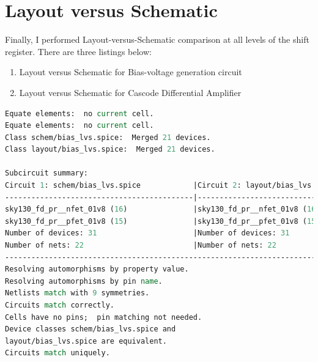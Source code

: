 \documentclass[11pt]{article}
\begin{document}
    \section{Layout versus Schematic}
    Finally, I performed Layout-versus-Schematic comparison at all levels of the shift register. There are three listings below:
    \begin{enumerate}
        \item Layout versus Schematic for Bias-voltage generation circuit
        \item Layout versus Schematic for Cascode Differential Amplifier
    \end{enumerate}
    \begin{lstlisting}[language=tcl, caption=\textbf{Layout versus Schematic for Bias-voltage generation circuit}]
Equate elements:  no current cell.
Equate elements:  no current cell.
Class schem/bias_lvs.spice:  Merged 21 devices.
Class layout/bias_lvs.spice:  Merged 21 devices.

Subcircuit summary:
Circuit 1: schem/bias_lvs.spice            |Circuit 2: layout/bias_lvs.spice           
-------------------------------------------|-------------------------------------------
sky130_fd_pr__nfet_01v8 (16)               |sky130_fd_pr__nfet_01v8 (16)               
sky130_fd_pr__pfet_01v8 (15)               |sky130_fd_pr__pfet_01v8 (15)               
Number of devices: 31                      |Number of devices: 31                      
Number of nets: 22                         |Number of nets: 22                         
---------------------------------------------------------------------------------------
Resolving automorphisms by property value.
Resolving automorphisms by pin name.
Netlists match with 9 symmetries.
Circuits match correctly.
Cells have no pins;  pin matching not needed.
Device classes schem/bias_lvs.spice and 
layout/bias_lvs.spice are equivalent.
Circuits match uniquely.
\end{lstlisting}
\end{document}
